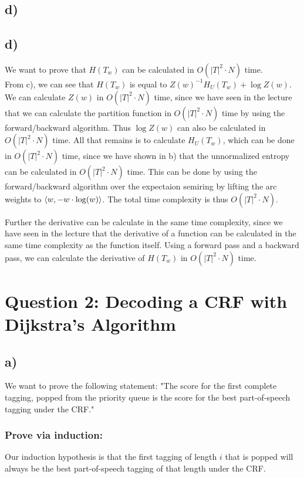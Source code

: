 \documentclass[a4paper,12pt]{ETHexercise}
\begin{document}
\subsection*{d)}

\subsection*{d)} 
We want to prove that $H(T_w)$ can be calculated in $O(|T|^2 \cdot N)$ time.\\

From c), we can see that $H(T_w)$  is equal to $Z(w)^{-1}H_{U}(T_w)+\log Z(w)$.
We can calculate $Z(w)$ in $O(|T|^2 \cdot N)$ time, since we have seen in the lecture that we can calculate the partition function in $O(|T|^2 \cdot N)$ time by using the forward/backward algorithm. Thus $\log Z(w)$ can also be calculated in $O(|T|^2 \cdot N)$ time.
All that remains is to calculate $H_{U}(T_w)$, which can be done in $O(|T|^2 \cdot N)$ time, since we have shown in b) that the unnormalized entropy can be calculated in $O(|T|^2 \cdot N)$ time. This can be done by using the forward/backward algorithm over the expectaion semiring by lifting the arc weights to $\left\langle w, -w \cdot \log (w)\right\rangle$.
The total time complexity is thus $O(|T|^2 \cdot N)$.

Further the derivative can be calculate in the same time complexity, since we have seen in the lecture that the derivative of a function can be calculated in the same time complexity as the function itself. Using a forward pass and a backward pass, we can calculate the derivative of $H(T_w)$ in $O(|T|^2 \cdot N)$ time.

\section*{Question 2: Decoding a CRF with Dijkstra's Algorithm}
\subsection*{a)}
We want to prove the following statement: "The score for the first complete tagging, popped from the priority queue is the score for the best part-of-speech tagging under the CRF."

\subsubsection*{Prove via induction:}

Our induction hypothesis is that the first tagging of length $i$ that is popped will always be the best part-of-speech tagging of that length under the CRF.
\end{document}
